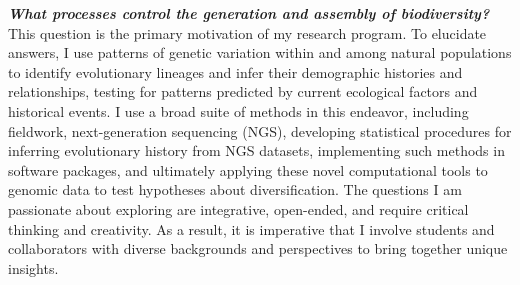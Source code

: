\textbf{\textit{What processes control the generation and assembly of
        biodiversity?}}
This question is the primary motivation of my research program.
To elucidate answers, I use patterns of genetic variation within and among
natural populations to identify evolutionary lineages and infer their
demographic histories and relationships, testing for patterns predicted by
current ecological factors and historical events.  I use a broad suite of
methods in this endeavor, including
fieldwork,
next-generation sequencing (NGS),
developing statistical procedures for inferring evolutionary
history from NGS datasets,
implementing such methods in software packages,
and ultimately applying these novel computational tools to genomic data to test
hypotheses about diversification.
The questions I am passionate about exploring are integrative, open-ended, and
require critical thinking and creativity.
As a result, it is imperative that I involve students and collaborators with
diverse backgrounds and perspectives to bring together unique insights.

